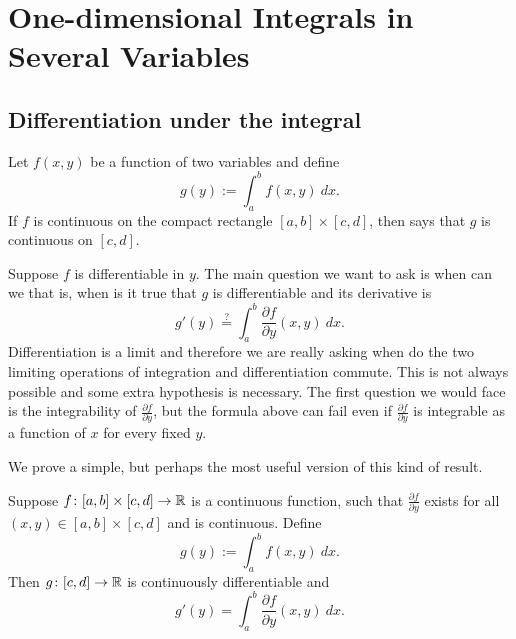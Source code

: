 \chapter{One-dimensional Integrals in Several Variables} \label{path:chapter}


\section{Differentiation under the integral}
\label{sec:diffunderint}


Let $f(x,y)$ be a function of two variables and define
\begin{equation*}
g(y) := \int_a^b f(x,y) ~dx .
\end{equation*}
If $f$ is continuous on the compact rectangle $[a,b] \times [c,d]$, then
says that $g$ is continuous on $[c,d]$.

Suppose $f$ is differentiable in $y$.  The main question we want to
ask is when can we  that is,
when is it true that $g$ is differentiable and its derivative is
\begin{equation*}
g'(y) \overset{?}{=} \int_a^b \frac{\partial f}{\partial y}(x,y) ~dx .
\end{equation*}
Differentiation is a limit and therefore we are really asking when do the
two limiting operations of integration and differentiation commute.
This is not always possible and some extra hypothesis is
necessary.  The first
question we would face is the integrability of
$\frac{\partial f}{\partial y}$, but the formula above can fail even if
$\frac{\partial f}{\partial y}$ is integrable as a function of $x$ for every
fixed $y$.

We prove a simple, but perhaps the most useful version of this kind of result.

\begin{thm}
Suppose $f \colon [a,b] \times [c,d] \to {\mathbb{R}}$ is a continuous function,
such that $\frac{\partial f}{\partial y}$ exists for all $(x,y) \in [a,b]
\times [c,d]$ and is continuous.  Define
\begin{equation*}
g(y) := \int_a^b f(x,y) ~dx .
\end{equation*}
Then $g \colon [c,d] \to {\mathbb{R}}$ is continuously differentiable and
\begin{equation*}
g'(y) = \int_a^b \frac{\partial f}{\partial y}(x,y) ~dx .
\end{equation*}
\end{thm}

